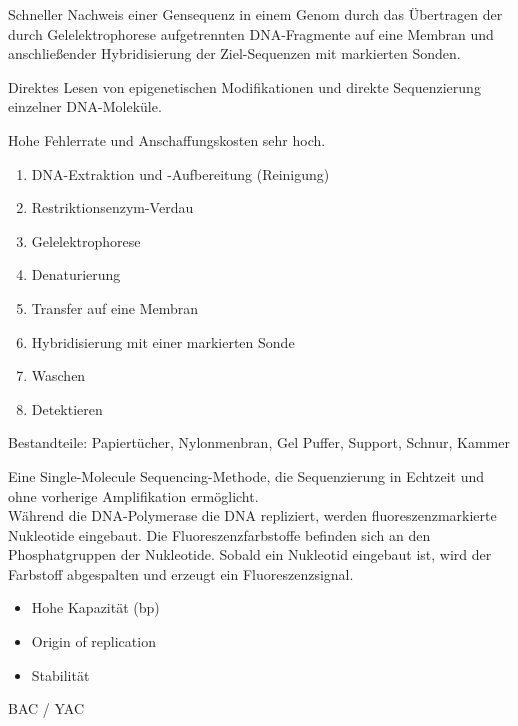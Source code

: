 Schneller Nachweis einer Gensequenz in einem Genom durch das Übertragen der durch Gelelektrophorese aufgetrennten DNA-Fragmente auf eine Membran und anschließender Hybridisierung der Ziel-Sequenzen mit markierten Sonden.  \\ \newline

Direktes Lesen von epigenetischen Modifikationen und direkte Sequenzierung einzelner DNA-Moleküle. \\ \newline

Hohe Fehlerrate und Anschaffungskosten sehr hoch. \\ \newline

\begin{enumerate}
    \item DNA-Extraktion und -Aufbereitung (Reinigung)
    \item Restriktionsenzym-Verdau
    \item Gelelektrophorese
    \item Denaturierung
    \item Transfer auf eine Membran
    \item Hybridisierung mit einer markierten Sonde
    \item Waschen
    \item Detektieren
\end{enumerate}
Bestandteile: Papiertücher, Nylonmenbran, Gel Puffer, Support, Schnur, Kammer \\ \newline


Eine Single-Molecule Sequencing-Methode, die Sequenzierung in Echtzeit und ohne vorherige Amplifikation ermöglicht.  \\
Während die DNA-Polymerase die DNA repliziert, werden fluoreszenzmarkierte Nukleotide eingebaut. Die Fluoreszenzfarbstoffe befinden sich an den Phosphatgruppen der Nukleotide. Sobald ein Nukleotid eingebaut ist, wird der Farbstoff abgespalten und erzeugt ein Fluoreszenzsignal. \\ \newline


\begin{itemize}
    \item Hohe Kapazität (bp)
    \item Origin of replication
    \item Stabilität
\end{itemize}
BAC / YAC \\ \newline

